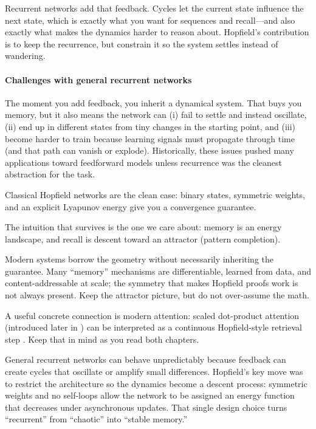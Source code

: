 Recurrent networks add that feedback. Cycles let the current state influence the next state, which is exactly what you want for sequences and recall---and also exactly what makes the dynamics harder to reason about. Hopfield's contribution is to keep the recurrence, but constrain it so the system settles instead of wandering.

\paragraph{Challenges with general recurrent networks}
The moment you add feedback, you inherit a dynamical system. That buys you memory, but it also means the network can (i) fail to settle and instead oscillate, (ii) end up in different states from tiny changes in the starting point, and (iii) become harder to train because learning signals must propagate through time (and that path can vanish or explode). Historically, these issues pushed many applications toward feedforward models unless recurrence was the cleanest abstraction for the task.

\begin{tcolorbox}[summarybox, title={Then vs.\ now: energy-based memory in context}]
Classical Hopfield networks are the clean case: binary states, symmetric weights, and an explicit Lyapunov energy give you a convergence guarantee.

The intuition that survives is the one we care about: memory is an energy landscape, and recall is descent toward an attractor (pattern completion).

Modern systems borrow the geometry without necessarily inheriting the guarantee. Many ``memory'' mechanisms are differentiable, learned from data, and content-addressable at scale; the symmetry that makes Hopfield proofs work is not always present. Keep the attractor picture, but do not over-assume the math.

A useful concrete connection is modern attention: scaled dot-product attention (introduced later in ) can be interpreted as a continuous Hopfield-style retrieval step \citep{Ramsauer2021}. Keep that in mind as you read both chapters.
\end{tcolorbox}

\begin{tcolorbox}[summarybox, title={Author's note: stabilizing recurrence}]
General recurrent networks can behave unpredictably because feedback can create cycles that oscillate or amplify small differences. Hopfield's key move was to restrict the architecture so the dynamics become a descent process: symmetric weights and no self-loops allow the network to be assigned an energy function that decreases under asynchronous updates. That single design choice turns ``recurrent'' from ``chaotic'' into ``stable memory.''
\end{tcolorbox}

